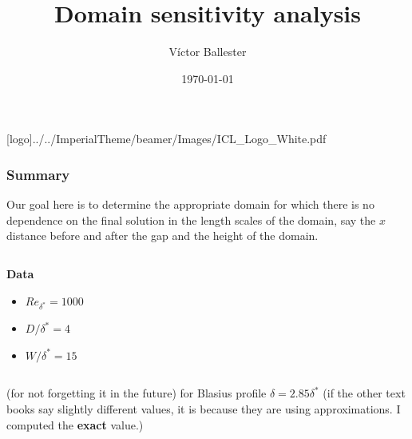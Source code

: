 \documentclass[
	aspectratio=169, %
	t, %
	onlytextwidth, %
	10pt, %
]{beamer}
\title{Domain sensitivity analysis} %
\subtitle{} %
\author{Víctor Ballester} %
\date{\today} %
\def\imagefolder{../../ImperialTheme/beamer/Images}
\begin{document}
\begingroup
{} %
[logo]{\imagefolder/ICL_Logo_White.pdf} %
\frame[plain, s]{\titlepage} %
\endgroup

\begin{frame}
	\frametitle{Summary}
	Our goal here is to determine the appropriate domain for which there is no dependence on the final solution in the length scales of the domain, say the $x$ distance before and after the gap and the height of the domain.

	\begin{columns}[T] %
		\begin{column}{0.48\linewidth} %
			\textbf{Data}
			\begin{itemize}
				\item $Re_{\delta^*} = 1000$
				\item $D/\delta^* = 4$
				\item $W/\delta^* = 15$
			\end{itemize}
		\end{column}
	\end{columns}

	(for not forgetting it in the future) for Blasius profile $\delta = 2.85 \delta^*$ (if the other text books say slightly different values, it is because they are using approximations. I computed the \textbf{exact} value.)
\end{frame}
\end{document}

